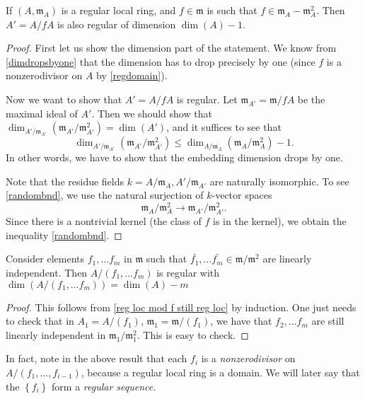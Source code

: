 \begin{proposition}
If $(A, \mathfrak{m}_A)$ is a regular local ring, and $f \in \mathfrak{m}$ is such that $f \in
\mathfrak{m}_A- \mathfrak{m}_A^2$. Then $A'=A/fA$ is also regular of dimension $\dim(A)-1$.
\label{reg loc mod f still reg loc}
\end{proposition}
\begin{proof} First let us show the dimension part of the statement. We know
from \cref{dimdropsbyone} that the dimension has to drop precisely by one (since $f$ is  a
nonzerodivisor on $A$ by \cref{regdomain}). 


Now we want to show that $A' = A/fA$ is regular. 
Let $\mathfrak{m}_{A'} = \mathfrak{m}/fA$ be the maximal ideal of $A'$.
Then we should show that
$\dim_{A'/\mathfrak{m}_{A'}}(\mathfrak{m}_{A'}/\mathfrak{m}_{A'}^2)=\dim(A')$,
and it suffices to see that  \begin{equation} \label{randombnd}
\dim_{A'/\mathfrak{m}_{A'}}(\mathfrak{m}_{A'}/\mathfrak{m}_{A'}^2) \leq
\dim_{A/\mathfrak{m}_A}(\mathfrak{m}_{A}/\mathfrak{m}_A^2)-1.\end{equation}
In other words, we have to show that the embedding dimension drops by one.


Note that the residue fields $k=A/\mathfrak{m}_A, A'/\mathfrak{m}_{A'}$ are
naturally isomorphic.
To see \eqref{randombnd}, we use the natural surjection of $k$-vector spaces
\[ \mathfrak{m}_A/\mathfrak{m}_A^2 \to \mathfrak{m}_{A'}/\mathfrak{m}_{A'}^2.  \]
Since there is a nontrivial kernel (the class of $f$ is in the kernel), we
obtain the inequality \eqref{randombnd}.
\end{proof}



\begin{corollary}  Consider elements $f_1, \ldots f_m$ in $\mathfrak{m}$ such
that $\bar{f_1}, \ldots \bar{f_m} \in \mathfrak{m}/\mathfrak{m}^2$ are linearly independent. Then $A/(f_1, \ldots f_m)$ is regular with $\dim(A/(f_1, \ldots f_m))=\dim(A)-m$
\label{reg local mod fs still reg loc}
\end{corollary}
\begin{proof} This follows from \cref{reg loc mod f still reg loc} by induction. One just needs to check that in $A_1=A/(f_1)$, $\mathfrak{m}_1=\mathfrak{m}/(f_1)$, we have that $f_2, \ldots f_m$ are still linearly independent in $\mathfrak{m}_1/\mathfrak{m}_1^2$. This is easy to check.
\end{proof}

In fact, note in the above result that each $f_i$ is a \emph{nonzerodivisor} on $A/(f_1, \dots,
f_{i-1})$, because a regular local ring is a domain. We will later say that the
$\left\{f_i\right\}$ form a \emph{regular sequence.}

